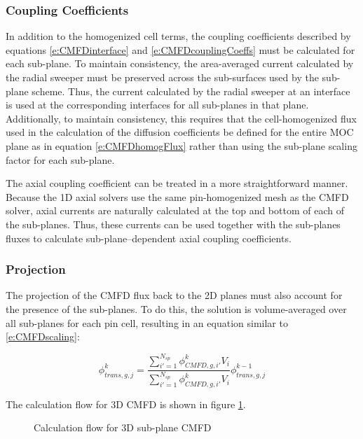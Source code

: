 \subsubsection{Coupling Coefficients}

In addition to the homogenized cell terms, the coupling coefficients described by equations \ref{e:CMFDinterface} and \ref{e:CMFDcouplingCoeffs} must be calculated for each sub-plane.  To maintain consistency, the area-averaged current calculated by the radial sweeper must be preserved across the sub-surfaces used by the sub-plane scheme.  Thus, the current calculated by the radial sweeper at an interface is used at the corresponding interfaces for all sub-planes in that plane.  Additionally, to maintain consistency, this requires that the cell-homogenized flux used in the calculation of the diffusion coefficients be defined for the entire MOC plane as in equation \ref{e:CMFDhomogFlux} rather than using the sub-plane scaling factor for each sub-plane.

The axial coupling coefficient can be treated in a more straightforward manner.  Because the 1D axial solvers use the same pin-homogenized mesh as the CMFD solver, axial currents are naturally calculated at the top and bottom of each of the sub-planes.  Thus, these currents can be used together with the sub-planes fluxes to calculate sub-plane--dependent axial coupling coefficients.

\subsubsection{Projection}

The projection of the CMFD flux back to the 2D planes must also account for the presence of the sub-planes.  To do this, the solution is volume-averaged over all sub-planes for each pin cell, resulting in an equation similar to \ref{e:CMFDscaling}:

\begin{equation}
\phi_{trans,g,j}^k = \frac{\sum_{i'=1}^{N_{sp}} \phi_{CMFD,g,i'}^k V_i}{\sum_{i'=1}^{N_{sp}} \phi_{CMFD,g,i'}^k V_i} \phi_{trans,g,j}^{k-1}
\end{equation}

The calculation flow for 3D CMFD is shown in figure \ref{f:CMFD-flowchart}.

\begin{figure}[h]
  \centering
  
  \caption{Calculation flow for 3D sub-plane CMFD}\label{f:CMFD-flowchart}
\end{figure}

